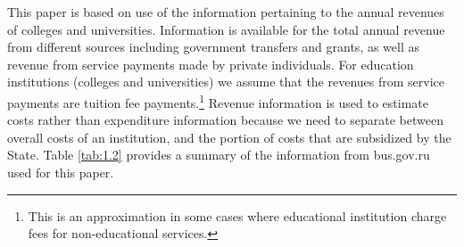 \documentclass[alpha-refs]{wiley-article-05g}
\begin{document}
\vspace{0.5em}

This paper is based on use of the information pertaining to the annual revenues of colleges and universities. Information is available for the total annual revenue from different sources including government transfers and grants, as well as revenue from service payments made by private individuals. For education institutions (colleges and universities) we assume that the revenues from service payments are tuition fee payments.\footnote{This is an approximation in some cases where educational institution charge fees for non-educational services.} Revenue information is used to estimate costs rather than expenditure information because we need to separate between overall costs of an institution, and the portion of costs that are subsidized by the State. Table \ref{tab:1.2} provides a summary of the information from bus.gov.ru used for this paper. 
\end{document}
